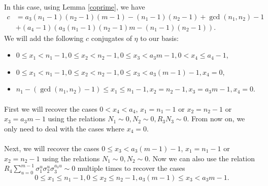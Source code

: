 \documentclass[12pt,a4paper]{article}
\begin{document}
In this case, using Lemma \ref{coprime}, we have
\begin{equation*}
\begin{split}
c&=a_3\left(n_1-1\right)\left(n_2-1\right)\left(m-1\right)-\left(n_1-1\right)\left(n_2-1\right)+\gcd\left(n_1,n_2\right)-1\\
&+(a_4-1)\left(a_3\left(n_1-1\right)\left(n_2-1\right)m-\left(n_1-1\right)\left(n_2-1\right)\right).
\end{split}
\end{equation*}
We will add the following $c$ conjugates of $\eta$ to our basis:
\begin{itemize}
\item $0\leq x_1<n_1-1, 0\leq x_2<n_2-1, 0\leq x_3<a_3m-1, 0<x_4\leq a_4-1$,
\item $0\leq x_1<n_1-1, 0\leq x_2<n_2-1, 0\leq x_3<a_3(m-1)-1, x_4=0$,
\item $n_1-(\gcd\left(n_1,n_2\right)-1)\leq x_1\leq n_1-1, x_2=n_2-1, x_3=a_3m-1, x_4=0$.
\end{itemize}

\paragraph*{}
First we will recover the cases $0<x_4<a_4$, $x_1=n_1-1$ or $x_2=n_2-1$ or $x_3=a_3m-1$ using the relations $N_1\sim 0, N_2\sim 0, R_3N_3\sim 0$. From now on, we only need to deal with the cases where $x_4=0$.
\paragraph*{}
Next, we will recover the cases $0\leq x_3<a_3(m-1)-1$, $x_1=n_1-1$ or $x_2=n_2-1$ using the relations $N_1\sim 0, N_2\sim 0$. Now we can also use the relation $R_4\sum_{u=0}^{m-1}\sigma_1^{u}\sigma_2^{u}\sigma_3^{a_3u}\sim 0$ multiple times to recover the cases $$0\leq x_1\leq n_1-1, 0\leq x_2\leq n_2-1, a_3(m-1)\leq x_3<a_3m-1.$$
\end{document}
